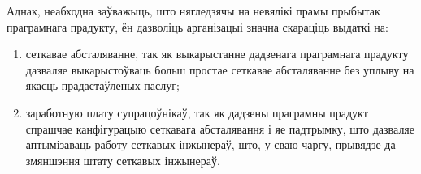 Аднак, неабходна заўважыць, што нягледзячы на невялікі прамы прыбытак праграмнага прадукту, ён дазволіць арганізацыі значна скараціць выдаткі на:
\begin{enumerate}
    \item сеткавае абсталяванне, так як выкарыстанне дадзенага праграмнага прадукту дазваляе выкарыстоўваць больш простае сеткавае абсталяванне без уплыву на якасць прадастаўленых паслуг;
    \item заработную плату супрацоўнікаў, так як дадзены праграмны прадукт спрашчае канфігурацыю сеткавага абсталявання і яе падтрымку, што дазваляе аптымізаваць работу сеткавых інжынераў, што, у сваю чаргу, прывядзе да змяншэння штату сеткавых інжынераў.
\end{enumerate}
